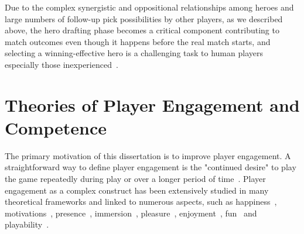 Due to the complex synergistic and oppositional relationships among heroes and large numbers of follow-up pick possibilities by other players, as we described above, the hero drafting phase becomes a critical component contributing to match outcomes even though it happens before the real match starts, and selecting a winning-effective hero is a challenging task to human players especially those inexperienced~\cite{johnson2015all}. 




\section{Theories of Player Engagement and Competence}

The primary motivation of this dissertation is to improve player engagement. A straightforward way to define player engagement is the "continued desire" to play the game repeatedly during play or over a longer period of time~\cite{schoenau2011player}. Player engagement as a complex construct has been extensively studied in many theoretical frameworks and linked to numerous aspects, such as happiness~\cite{sweetser2005gameflow,flow1990psychology,chen2007flow}, motivations~\cite{przybylski2010motivational,ryan2006motivational,yee2006demographics,yee2006motivations,sherry2006video}, presence~\cite{lombard1997heart,tamborini2006role}, immersion~\cite{mcmahan2003immersion,brown2004grounded,jennett2008measuring,ermi2005fundamental}, pleasure~\cite{costello2009tool}, enjoyment~\cite{ravaja2007fun,klimmt2003dimensions,mekler2014systematic}, fun~\cite{koster2013theory} and playability~\cite{federoff2003improving,federoff2002heuristics,desurvire2004using,nacke2009playability}.

